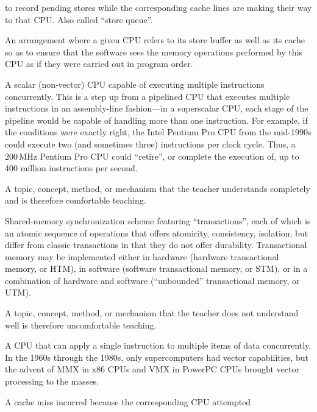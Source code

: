 \begin{description}
	to record pending stores
	while the corresponding cache lines are making their
	way to that CPU.
	Also called ``store queue''.
\item[Store Forwarding:]
	An arrangement where a given CPU refers to its store buffer
	as well as its cache so as to ensure that the software sees
	the memory operations performed by this CPU as if they
	were carried out in program order.
\item[Superscalar CPU:]
	A scalar (non-vector) CPU capable of executing multiple instructions
	concurrently.
	This is a step up from a pipelined CPU that executes multiple
	instructions in an assembly-line fashion---in a superscalar
	CPU, each stage of the pipeline would be capable of handling
	more than one instruction.
	For example, if the conditions were exactly right,
	the Intel Pentium Pro CPU from the mid-1990s could
	execute two (and sometimes three) instructions per clock cycle.
	Thus, a 200\,MHz Pentium Pro CPU could ``retire'', or complete the
	execution of, up to 400 million instructions per second.
\item[Teachable:]
	A topic, concept, method, or mechanism that the teacher understands
	completely and is therefore comfortable teaching.
\item[Transactional Memory (TM):]
	Shared-memory synchronization scheme featuring ``transactions'',
	each of which is an atomic sequence of operations
	that offers atomicity, consistency, isolation, but differ from
	classic transactions in that they do not offer
	durability.
	Transactional memory may be implemented either in hardware
	(hardware transactional memory, or HTM), in software (software
	transactional memory, or STM), or in a combination of hardware
	and software (``unbounded'' transactional memory, or UTM).
\item[Unteachable:]
	A topic, concept, method, or mechanism that the teacher does
	not understand well is therefore uncomfortable teaching.
\item[Vector CPU:]
	A CPU that can apply a single instruction to multiple items of
	data concurrently.
	In the 1960s through the 1980s, only supercomputers had vector
	capabilities, but the advent of MMX in x86 CPUs and VMX in
	PowerPC CPUs brought vector processing to the masses.
\item[\IXh{Write Miss}{Cache miss}{write}:]
	A cache miss incurred because the corresponding CPU attempted

\end{description}
